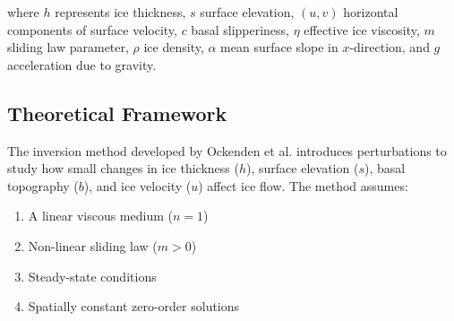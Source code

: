 where $h$ represents ice thickness, $s$ surface elevation, $(u, v)$ horizontal components of surface velocity, $c$ basal slipperiness, $\eta$ effective ice viscosity, $m$ sliding law parameter, $\rho$ ice density, $\alpha$ mean surface slope in $x$-direction, and $g$ acceleration due to gravity.


\subsection*{Theoretical Framework}


The inversion method developed by Ockenden et al. introduces perturbations to study how small changes in ice thickness ($h$), surface elevation ($s$), basal topography ($b$), and ice velocity ($u$) affect ice flow. The method assumes:
\begin{enumerate}
\item A linear viscous medium ($n=1$)
\item Non-linear sliding law ($m>0$)
\item Steady-state conditions
\item Spatially constant zero-order solutions
\end{enumerate}




